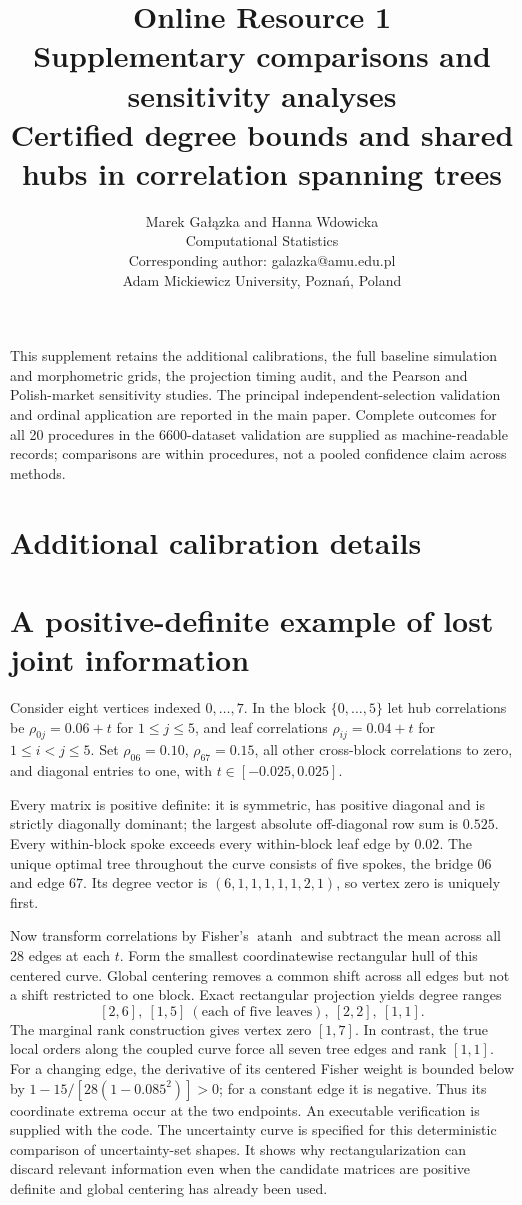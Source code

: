\documentclass[11pt]{article}
\title{Online Resource 1\\[4pt]\large Supplementary comparisons and sensitivity analyses\\[5pt]\normalsize Certified degree bounds and shared hubs in correlation spanning trees}
\author{Marek Ga\l{}\k{a}zka and Hanna Wdowicka\\[4pt]\small Computational Statistics\\\small Corresponding author: galazka@amu.edu.pl\\\small Adam Mickiewicz University, Pozna\'n, Poland}
\date{}
\theoremstyle{plain}
\theoremstyle{definition}\newtheorem{remark}{Remark}\newtheorem{example}{Example}
\begin{document}
\maketitle
This supplement retains the additional calibrations, the full baseline simulation and morphometric grids, the projection timing audit, and the Pearson and Polish-market sensitivity studies. The principal independent-selection validation and ordinal application are reported in the main paper. Complete outcomes for all 20 procedures in the 6600-dataset validation are supplied as machine-readable records; comparisons are within procedures, not a pooled confidence claim across methods.
\section{Additional calibration details}

\section{A positive-definite example of lost joint information}\label{sec:example}
Consider eight vertices indexed $0,\ldots,7$. In the block $\{0,\ldots,5\}$ let hub correlations be $\rho_{0j}=0.06+t$ for $1\le j\le5$, and leaf correlations $\rho_{ij}=0.04+t$ for $1\le i<j\le5$. Set $\rho_{06}=0.10$, $\rho_{67}=0.15$, all other cross-block correlations to zero, and diagonal entries to one, with $t\in[-0.025,0.025]$.

Every matrix is positive definite: it is symmetric, has positive diagonal and is strictly diagonally dominant; the largest absolute off-diagonal row sum is $0.525$. Every within-block spoke exceeds every within-block leaf edge by $0.02$. The unique optimal tree throughout the curve consists of five spokes, the bridge $06$ and edge $67$. Its degree vector is $(6,1,1,1,1,1,2,1)$, so vertex zero is uniquely first.

Now transform correlations by Fisher's $\operatorname{atanh}$ and subtract the mean across all 28 edges at each $t$. Form the smallest coordinatewise rectangular hull of this centered curve. Global centering removes a common shift across all edges but not a shift restricted to one block. Exact rectangular projection yields degree ranges
\[
 [2,6],\ [1,5]\ (\text{each of five leaves}),\ [2,2],\ [1,1].
\]
The marginal rank construction gives vertex zero $[1,7]$. In contrast, the true local orders along the coupled curve force all seven tree edges and rank $[1,1]$. For a changing edge, the derivative of its centered Fisher weight is bounded below by $1-15/[28(1-0.085^2)]>0$; for a constant edge it is negative. Thus its coordinate extrema occur at the two endpoints. An executable verification is supplied with the code. The uncertainty curve is specified for this deterministic comparison of uncertainty-set shapes. It shows why rectangularization can discard relevant information even when the candidate matrices are positive definite and global centering has already been used.
\end{document}

